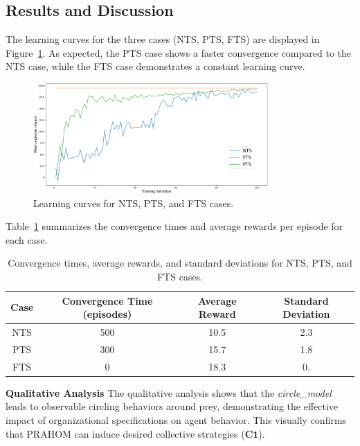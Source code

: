 \documentclass[runningheads]{llncs}
\theoremstyle{freethm}
\theoremstyle{proofoutline}
\begin{document}
\subsection{Results and Discussion}

The learning curves for the three cases (NTS, PTS, FTS) are displayed in Figure~\ref{fig:learning_curves}. As expected, the PTS case shows a faster convergence compared to the NTS case, while the FTS case demonstrates a constant learning curve.

\begin{figure}[h!]
    \centering
    \includegraphics[width=0.8\textwidth]{figures/prahom_learning_curve.png}
    \caption{Learning curves for NTS, PTS, and FTS cases.}
    \label{fig:learning_curves}
\end{figure}

Table~\ref{tab:results} summarizes the convergence times and average rewards per episode for each case.

\begin{table}[h!]
    \centering
    \begin{tabular}{|c|c|c|c|}
        \hline
        Case & Convergence Time (episodes) & Average Reward & Standard Deviation \\
        \hline
        NTS  & 500                         & 10.5           & 2.3                \\
        PTS  & 300                         & 15.7           & 1.8                \\
        FTS  & 0                           & 18.3           & 0.                \\
        \hline
    \end{tabular}
    \caption{Convergence times, average rewards, and standard deviations for NTS, PTS, and FTS cases.}
    \label{tab:results}
\end{table}


\textbf{Qualitative Analysis} \quad The qualitative analysis shows that the \textit{circle\_model} leads to observable circling behaviors around prey, demonstrating the effective impact of organizational specifications on agent behavior. This visually \footnotemark[2] confirms that PRAHOM can induce desired collective strategies ($\mathbf{C1}$).
\end{document}
